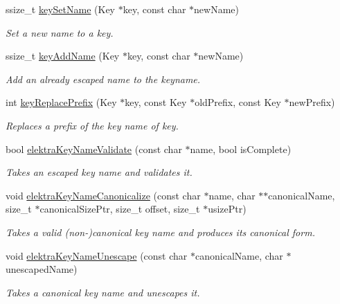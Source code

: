 \begin{DoxyCompactItemize}
ssize\+\_\+t \hyperlink{group__keyname_ga7699091610e7f3f43d2949514a4b35d9}{key\+Set\+Name} (Key $\ast$key, const char $\ast$new\+Name)
\begin{DoxyCompactList}\small\item\em Set a new name to a key. \end{DoxyCompactList}\item 
ssize\+\_\+t \hyperlink{group__keyname_gaa70593a2c772c4b7bc33423b9b10a270}{key\+Add\+Name} (Key $\ast$key, const char $\ast$new\+Name)
\begin{DoxyCompactList}\small\item\em Add an already escaped name to the keyname. \end{DoxyCompactList}\item 
int \hyperlink{group__keyname_gae22037aad3f76f4454de4e6400637b39}{key\+Replace\+Prefix} (Key $\ast$key, const Key $\ast$old\+Prefix, const Key $\ast$new\+Prefix)
\begin{DoxyCompactList}\small\item\em Replaces a prefix of the key name of {\ttfamily key}. \end{DoxyCompactList}\item 
bool \hyperlink{group__keyname_ga26bacb092ebca8f69f3fee72069733d8}{elektra\+Key\+Name\+Validate} (const char $\ast$name, bool is\+Complete)
\begin{DoxyCompactList}\small\item\em Takes an escaped key name and validates it. \end{DoxyCompactList}\item 
void \hyperlink{group__keyname_ga99ef3765a0ea0887c8ab72859ae2592e}{elektra\+Key\+Name\+Canonicalize} (const char $\ast$name, char $\ast$$\ast$canonical\+Name, size\+\_\+t $\ast$canonical\+Size\+Ptr, size\+\_\+t offset, size\+\_\+t $\ast$usize\+Ptr)
\begin{DoxyCompactList}\small\item\em Takes a valid (non-\/)canonical key name and produces its canonical form. \end{DoxyCompactList}\item 
void \hyperlink{group__keyname_ga85dd2a5169e900c6c8371c54c7944edb}{elektra\+Key\+Name\+Unescape} (const char $\ast$canonical\+Name, char $\ast$unescaped\+Name)
\begin{DoxyCompactList}\small\item\em Takes a canonical key name and unescapes it. \end{DoxyCompactList}\item 
$$
\end{DoxyCompactItemize}
